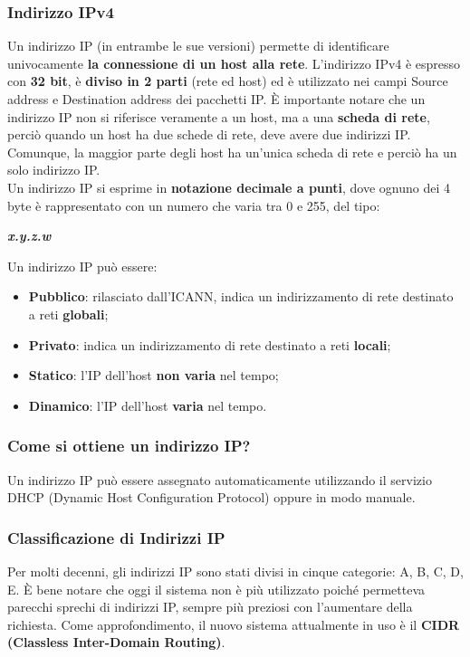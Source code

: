             \subsubsection*{Indirizzo IPv4}
            Un indirizzo IP (in entrambe le sue versioni) permette di identificare univocamente \textbf{la
            connessione di un host alla rete}. L’indirizzo IPv4 è espresso con \textbf{32 bit}, è \textbf{diviso in 2 parti}
            (rete ed host) ed è utilizzato nei campi Source address e Destination address dei pacchetti IP. È
            importante notare che un indirizzo IP non si riferisce veramente a un host, ma a una \textbf{scheda di
            rete}, perciò quando un host ha due schede di rete, deve avere due indirizzi IP. Comunque, la
            maggior parte degli host ha un’unica scheda di rete e perciò ha un solo indirizzo IP.\\
            
            Un indirizzo IP si esprime in \textbf{notazione decimale a punti}, dove ognuno dei 4 byte è
            rappresentato con un numero che varia tra 0 e 255, del tipo:
            
            \begin{center}
                \textbf{\emph{x.y.z.w}}
            \end{center}
            Un indirizzo IP può essere:
            \begin{itemize}
                \item \textbf{Pubblico}: rilasciato dall’ICANN, indica un indirizzamento di rete destinato a reti \textbf{globali};
                \item \textbf{Privato}: indica un indirizzamento di rete destinato a reti \textbf{locali};
                \item \textbf{Statico}: l’IP dell’host \textbf{non varia} nel tempo;
                \item \textbf{Dinamico}: l’IP dell’host \textbf{varia} nel tempo.
            \end{itemize}
            \subsubsection*{Come si ottiene un indirizzo IP?}
            Un indirizzo IP può essere assegnato automaticamente utilizzando il servizio DHCP (Dynamic
            Host Configuration Protocol) oppure in modo manuale.

            \subsubsection*{Classificazione di Indirizzi IP}
            Per molti decenni, gli indirizzi IP sono stati divisi in cinque categorie: A, B, C, D, E.
            È bene notare che oggi il sistema non è più utilizzato poiché permetteva parecchi sprechi di
            indirizzi IP, sempre più preziosi con l’aumentare della richiesta. Come approfondimento, il
            nuovo sistema attualmente in uso è il \textbf{CIDR (Classless Inter-Domain Routing)}.\\
            

